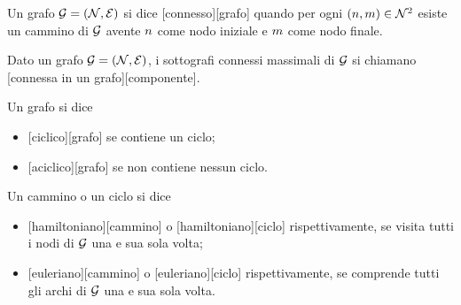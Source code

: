 \begin{Definition}
	Un grafo $\mathcal{G} = (\mathcal{N},\mathcal{E})$ si dice
  [connesso][grafo] quando per ogni
  $(n,m) \in \mathcal{N}^2$ esiste un cammino di $\mathcal{G}$ avente
  $n$ come nodo iniziale e $m$ come nodo finale.
\end{Definition}
\begin{Definition}
	Dato un grafo $\mathcal{G} = (\mathcal{N},\mathcal{E})$, i sottografi connessi
  massimali di $\mathcal{G}$ si chiamano
  [connessa in un grafo][componente].
\end{Definition}
\begin{Definition}
	Un grafo si dice
	\begin{itemize}
		\item {}[ciclico][grafo] se contiene un ciclo;
		\item {}[aciclico][grafo] se non contiene nessun
      ciclo.
	\end{itemize}
\end{Definition}
\begin{Definition}
	Un cammino o un ciclo si dice
  \begin{itemize}
    \item {}[hamiltoniano][cammino] o
      [hamiltoniano][ciclo]
      rispettivamente, se visita tutti i nodi di $\mathcal{G}$ una e sua sola
      volta;
    \item {}[euleriano][cammino] o
      [euleriano][ciclo]
      rispettivamente, se comprende tutti gli archi di $\mathcal{G}$ una e
      sua sola volta.
  \end{itemize}
\end{Definition}
